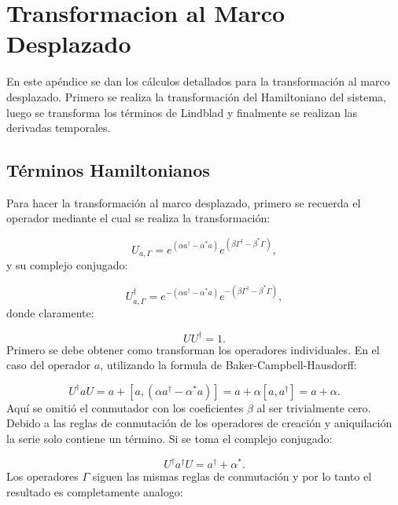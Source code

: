 \documentclass[a4paper,10pt]{report}
\begin{document}
\appendix

\chapter{Transformacion al Marco Desplazado}

En este apéndice se dan los cálculos detallados para la transformación al marco desplazado. Primero se realiza la transformación del Hamiltoniano del sistema, luego se transforma los términos de Lindblad y finalmente se realizan las derivadas temporales.

\section{Términos Hamiltonianos}

Para hacer la transformación al marco desplazado, primero se recuerda el operador mediante el cual se realiza la transformación:

\begin{equation}
U_{a,\Gamma} = e^{(\alpha a^\dagger - \alpha^*a)}e^{(\beta \Gamma^\dagger - \beta^*\Gamma)},
\end{equation} y su complejo conjugado:

\begin{equation}
U_{a,\Gamma}^{\dagger} = e^{-(\alpha a^\dagger - \alpha^*a)}e^{-(\beta \Gamma^\dagger - \beta^*\Gamma)},
\end{equation} donde claramente:

\begin{equation}
UU^{\dagger} = 1.
\end{equation} Primero se debe obtener como transforman los operadores individuales. En el caso del operador $a$, utilizando la formula de Baker-Campbell-Hausdorff:

\begin{equation}
U^{\dagger}aU = a +[a,(\alpha a^\dagger - \alpha^*a)] = a +\alpha[a,a^{\dagger}]=a+\alpha.
\end{equation} Aquí se omitió el conmutador con los coeficientes $\beta$ al ser trivialmente cero. Debido a las reglas de conmutación de los operadores de creación y aniquilación la serie solo contiene un término. Si se toma el complejo conjugado:

\begin{equation}
U^{\dagger}a^{\dagger}U = a^\dagger + \alpha^*.
\end{equation} Los operadores $\Gamma$ siguen las mismas reglas de conmutación y por lo tanto el resultado es completamente analogo:
\end{document}

